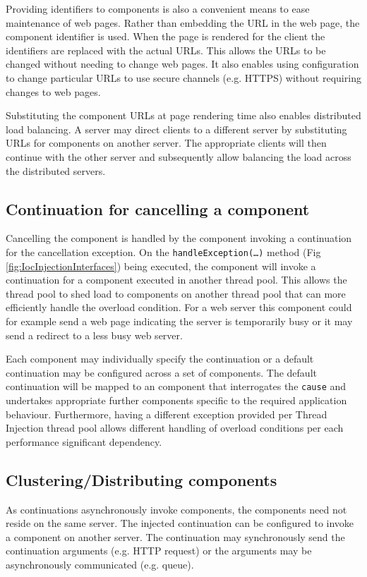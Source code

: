 \documentclass[prodmode]{style/acmlarge}
\begin{document}
Providing identifiers to components is also a convenient means to
ease maintenance of web pages.  Rather than embedding the URL in the web page,
the component identifier is used.  When the page is rendered for
the client the identifiers are replaced with the actual URLs.  This allows the
URLs to be changed without needing to change web pages.  It also enables using
configuration to change particular URLs to use secure channels (e.g. HTTPS)
without requiring changes to web pages.

Substituting the component URLs at page rendering time also enables distributed
load balancing.  A server may direct clients to a different server by
substituting URLs for components on another server. The appropriate clients will
then continue with the other server and subsequently allow balancing the load
across the distributed servers.


\subsection{Continuation for cancelling a component}

Cancelling the component is handled by the component invoking a continuation for
the cancellation exception.  On the \texttt{handleException(\ldots)} method (Fig
\ref{fig:IocInjectionInterfaces}) being executed, the component will invoke a
continuation for a component executed in another thread pool.  This allows the
thread pool to shed load to components on another thread pool that can more
efficiently handle the overload condition.  For a web server this component
could for example send a web page indicating the server is temporarily busy or
it may send a redirect to a less busy web server.

Each component may individually specify the continuation or a default
continuation may be configured across a set of components.
The default continuation will be mapped to an component that interrogates the
\texttt{cause} and undertakes appropriate further components specific to the
required application behaviour.  Furthermore, having a different exception
provided per Thread Injection thread pool allows different handling of overload
conditions per each performance significant dependency.


\subsection{Clustering/Distributing components}

As continuations asynchronously invoke components, the components need not
reside on the same server.  The injected continuation can be configured to
invoke a component on another server.  The continuation may synchronously send
the continuation arguments (e.g. HTTP request) or the arguments may be
asynchronously communicated (e.g. queue).
\end{document}
